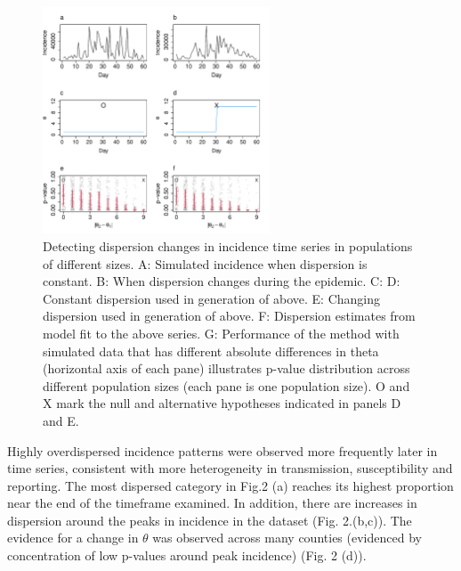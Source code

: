 \documentclass[10pt,letterpaper]{article}
\begin{document}
\begin{figure}[!h]
\includegraphics[width=0.6\textwidth]{fig1}
\caption{
Detecting dispersion changes in incidence time series in populations of different sizes. A: Simulated incidence when dispersion is constant. B: When dispersion changes during the epidemic. C:  D: Constant dispersion used in generation of above. E: Changing dispersion used in generation of above. F: Dispersion estimates from model fit to the above series. G: Performance of the method with simulated data that has different absolute differences in theta (horizontal axis of each pane) illustrates p-value distribution across different population sizes (each pane is one population size). O and X mark the null and alternative hypotheses indicated in panels D and E. 
 }
\label{fig1}
\end{figure}

Highly overdispersed incidence patterns were observed more frequently later in time series, consistent with more heterogeneity in transmission, susceptibility and reporting. 
The most dispersed category in Fig.2 (a) reaches its highest proportion near the end of the timeframe examined.
In addition, there are increases in dispersion around the peaks in incidence in the dataset (Fig. 2.(b,c)).
The evidence for a change in \begin{math}\theta\end{math} was observed across many counties (evidenced by concentration of low p-values around peak incidence) (Fig. 2 (d)).
\end{document}
